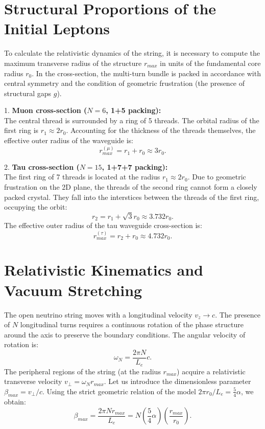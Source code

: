 \documentclass[12pt,a4paper]{article}
\begin{document}
	\section{Structural Proportions of the Initial Leptons}
	
	To calculate the relativistic dynamics of the string, it is necessary to compute the maximum transverse radius of the structure $r_{max}$ in units of the fundamental core radius $r_0$.
	In the cross-section, the multi-turn bundle is packed in accordance with central symmetry and the condition of geometric frustration (the presence of structural gaps $g$). 
	
	1. \textbf{Muon cross-section ($N=6$, 1+5 packing):}\\
	The central thread is surrounded by a ring of 5 threads. The orbital radius of the first ring is $r_1 \approx 2r_0$. Accounting for the thickness of the threads themselves, the effective outer radius of the waveguide is:
	\begin{equation}
		r_{max}^{(\mu)} = r_1 + r_0 \approx 3 r_0.
	\end{equation}
	
	2. \textbf{Tau cross-section ($N=15$, 1+7+7 packing):}\\
	The first ring of 7 threads is located at the radius $r_1 \approx 2r_0$. Due to geometric frustration on the 2D plane, the threads of the second ring cannot form a closely packed crystal. They fall into the interstices between the threads of the first ring, occupying the orbit:
	\begin{equation}
		r_2 = r_1 + \sqrt{3}r_0 \approx 3.732 r_0.
	\end{equation}
	The effective outer radius of the tau waveguide cross-section is:
	\begin{equation}
		r_{max}^{(\tau)} = r_2 + r_0 \approx 4.732 r_0.
	\end{equation}
	
	\section{Relativistic Kinematics and Vacuum Stretching}
	
	The open neutrino string moves with a longitudinal velocity $v_z \to c$. The presence of $N$ longitudinal turns requires a continuous rotation of the phase structure around the axis to preserve the boundary conditions. The angular velocity of rotation is:
	\begin{equation}
		\omega_N = \frac{2\pi N}{L_e} c.
	\end{equation}
	The peripheral regions of the string (at the radius $r_{max}$) acquire a relativistic transverse velocity $v_\perp = \omega_N r_{max}$. Let us introduce the dimensionless parameter $\beta_{max} = v_\perp / c$. Using the strict geometric relation of the model $2\pi r_0 / L_e = \frac{5}{4}\alpha$, we obtain:
	\begin{equation}
		\beta_{max} = \frac{2\pi N r_{max}}{L_e} = N \left( \frac{5}{4}\alpha \right) \left( \frac{r_{max}}{r_0} \right).
	\end{equation}
	
\end{document}
